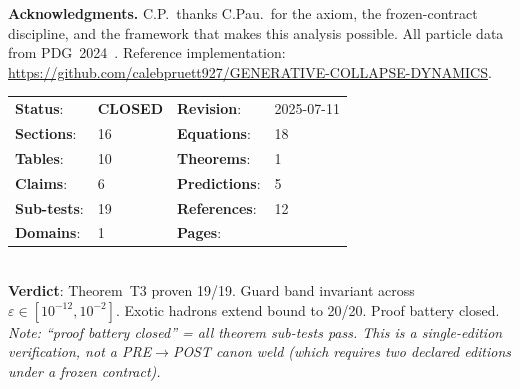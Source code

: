 \documentclass[
  aps,
  prd,
  twocolumn,
  superscriptaddress,
  nofootinbib,
  floatfix
]{revtex4-2}
\newcommand{\WeldID}{SS1m-CONFINE-T3-2025}
\newcommand{\RevisionDate}{2025-07-11}
\newcommand{\WeldStatus}{\textcolor{WeldGreen}{\textbf{CLOSED}}}
\newcommand{\EIDsections}{16}
\newcommand{\EIDequations}{18}
\newcommand{\EIDtables}{10}
\newcommand{\EIDtheorems}{1}
\newcommand{\EIDclaims}{6}
\newcommand{\EIDpredictions}{5}
\newcommand{\EIDsubtests}{19}
\newcommand{\EIDreferences}{12}
\newcommand{\EIDdomains}{1}
\newcommand{\eps}{\varepsilon}
\begin{document}
\begin{tcolorbox}[
  colback=PreambleBox, colframe=HUDGray,
  boxrule=0.4pt, arc=1pt, left=8pt, right=8pt
]
\small\textbf{Acknowledgments.}\enspace
C.P.\ thanks C.Pau.\ for the axiom, the frozen-contract
discipline, and the framework that makes this analysis possible.
All particle data from PDG~2024~\cite{pdg2024}.
Reference implementation:
\url{https://github.com/calebpruett927/GENERATIVE-COLLAPSE-DYNAMICS}.
\end{tcolorbox}

\vspace{4pt}

\begin{tcolorbox}[
  colback=white, colframe=WeldGreen,
  title={\small SS1m Proof-Battery Receipt — \WeldID},
  fonttitle=\bfseries\small,
  boxrule=1pt, arc=2pt, left=4pt, right=4pt
]
\scriptsize
\begin{tabular}{@{}ll@{\,}ll@{}}
\textbf{Status}: & \WeldStatus &
  \textbf{Revision}: & \RevisionDate \\
\textbf{Sections}: & \EIDsections &
  \textbf{Equations}: & \EIDequations \\
\textbf{Tables}: & \EIDtables &
  \textbf{Theorems}: & \EIDtheorems \\
\textbf{Claims}: & \EIDclaims &
  \textbf{Predictions}: & \EIDpredictions \\
\textbf{Sub-tests}: & \EIDsubtests &
  \textbf{References}: & \EIDreferences \\
\textbf{Domains}: & \EIDdomains &
  \textbf{Pages}: & \pageref{LastPage} \\
\end{tabular}\\[4pt]
\textbf{Verdict}: Theorem~T3 proven 19/19.
Guard band invariant across $\eps\in[10^{-12}, 10^{-2}]$.
Exotic hadrons extend bound to 20/20.
Proof battery closed.
\\[4pt]
{\scriptsize\textit{Note: ``proof battery closed'' = all theorem sub-tests pass.
This is a single-edition verification, not a PRE$\to$POST canon
weld (which requires two declared editions under a frozen contract).}}
\end{tcolorbox}



\end{document}
